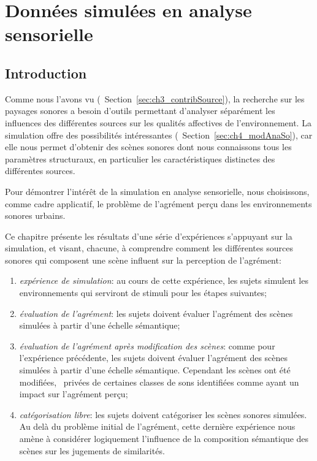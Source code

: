 \chapter[Données simulées en analyse sensorielle]{Données simulées en analyse sensorielle}\label{ch:psycho_xp}

\section{Introduction}

Comme nous l'avons vu (\cf~Section~\ref{sec:ch3_contribSource}), la recherche sur les paysages sonores a besoin d'outils permettant d'analyser séparément les influences des différentes sources sur les qualités affectives de l'environnement. La simulation offre des possibilités intéressantes (\cf~Section~\ref{sec:ch4_modAnaSo}), car elle nous permet d'obtenir des scènes sonores dont nous connaissons tous les paramètres structuraux, en particulier les caractéristiques distinctes des différentes sources. 
 
Pour démontrer l'intérêt de la simulation en analyse sensorielle, nous choisissons, comme cadre applicatif, le problème de l'agrément perçu dans les environnements sonores urbains. 

Ce chapitre présente les résultats d'une série d'expériences s'appuyant sur la simulation, et visant, chacune, à comprendre comment les différentes sources sonores qui composent une scène influent sur la perception de l'agrément:

\begin{enumerate}
\item \emph{expérience de simulation}: au cours de cette expérience, les sujets simulent les environnements qui serviront de stimuli pour les étapes suivantes;
\item \emph{évaluation de l'agrément}: les sujets doivent évaluer l'agrément des scènes simulées à partir d'une échelle sémantique;
\item \emph{évaluation de l'agrément après modification des scènes}: comme pour l'expérience précédente, les sujets doivent évaluer l'agrément des scènes simulées à partir d'une échelle sémantique. Cependant les scènes ont été modifiées, \ie~privées de certaines classes de sons identifiées comme ayant un impact sur l'agrément perçu; 
\item \emph{catégorisation libre}: les sujets doivent catégoriser les scènes sonores simulées. Au delà du problème initial de l'agrément, cette dernière expérience nous amène à considérer logiquement l'influence de la composition sémantique des scènes sur les jugements de similarités.
\end{enumerate}

